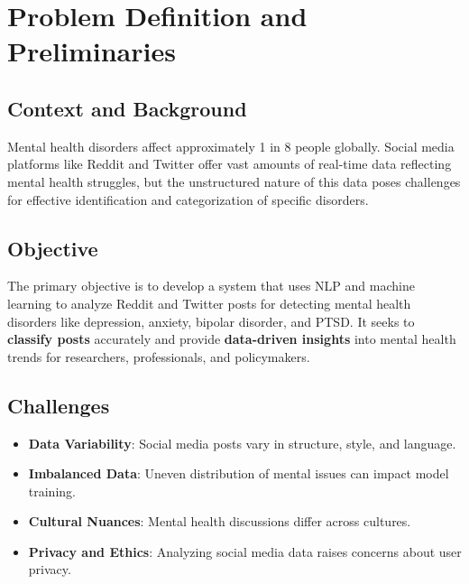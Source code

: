 \pagebreak
\section{Problem Definition and Preliminaries}

\begin{comment}
    State the problem you have solved. Define the boundaries of your project. What was included (scope) and what was not (exclusions)?
\vspace{.1in}

\noindent
Briefly explain the methods you used to conduct your research or complete the project. Were there specific tools, techniques or libraries employed?
\end{comment}

\subsection{Context and Background}
\noindent
Mental health disorders affect approximately 1 in 8 people globally. Social media platforms like Reddit and Twitter offer vast amounts of real-time data reflecting mental health struggles, but the unstructured nature of this data poses challenges for effective identification and categorization of specific disorders.

\subsection{Objective}
\noindent
The primary objective is to develop a system that uses NLP and machine learning to analyze Reddit and Twitter posts for detecting mental health disorders like depression, anxiety, bipolar disorder, and PTSD. It seeks to \textbf{classify posts} accurately and provide \textbf{data-driven insights} into mental health trends for researchers, professionals, and policymakers.

\subsection{Challenges}
\begin{itemize}
    \item \textbf{Data Variability}: Social media posts vary in structure, style, and language.
    \item \textbf{Imbalanced Data}: Uneven distribution of mental issues can impact model training.
    \item \textbf{Cultural Nuances}: Mental health discussions differ across cultures.
    \item \textbf{Privacy and Ethics}: Analyzing social media data raises concerns about user privacy.
\end{itemize}


